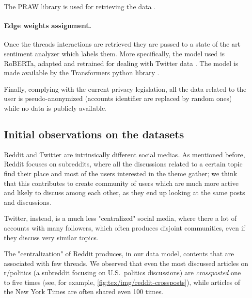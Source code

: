 The PRAW library is used for retrieving the data \cite{praw}.

\paragraph{Edge weights assignment.}%
\label{par:assigning_edge_weights}

Once the threads interactions are retrieved they are passed to a state of the
art sentiment analyzer which labels them. More specifically, the model used is
RoBERTa, adapted and retrained for dealing with Twitter
data \cite{Barbieri2020}. The model is made available by the Transformers
python library \cite{wolf-etal-2020-transformers}.

\bigskip

Finally, complying with the current privacy legislation, all the data related
to the user is pseudo-anonymized (accounts identifier are replaced by random
ones) while no data is publicly available.

\subsection{Initial observations on the datasets}%
\label{sub:some_observations_on_the_datasets}

Reddit and Twitter are intrinsically different social medias. As mentioned
before, Reddit focuses on subreddits, where all the discussions related to a
certain topic find their place and most of the users interested in the
theme gather; we think that this contributes to create community of users which are much more
active and likely to discuss among each other, as they end up looking at the
same posts and discussions.

Twitter, instead, is a much less "centralized" social media, where there a lot
of accounts with many followers, which often produces disjoint communities,
even if they discuss very similar topics.

The "centralization" of Reddit produces, in our data model, contents that are
associated with few threads. We observed that even the most discussed articles
on r/politics (a subreddit focusing on U.S.\ politics discussions) are
\emph{crossposted} one to five times (see, for example,
\autoref{fig:tex/img/reddit-crossposts}), while articles of the New York Times are
often shared even 100 times.

